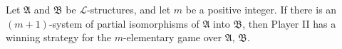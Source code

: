 Let $\mathfrak{A}$ and $\mathfrak{B}$ be $\mathcal{L}$-structures, and let $m$ be a positive integer. If there is an $(m + 1)$-system of partial isomorphisms of $\mathfrak{A}$ into $\mathfrak{B}$, then Player II has a winning strategy for the $m$-elementary game over $\mathfrak{A}$, $\mathfrak{B}$.
